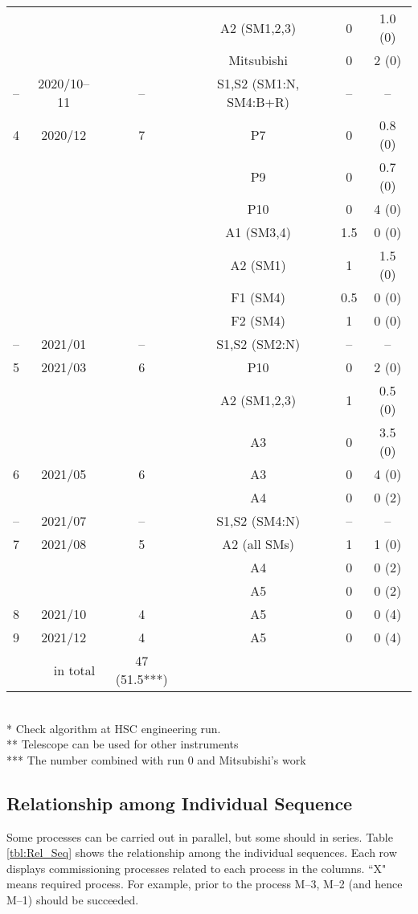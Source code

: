{\begin{table}[!ht]
\begin{center}
\begin{tabular}{*{3}{c}|*{3}{c}}
	&	&					& A2 (SM1,2,3)	& 0 	& 1.0 (0)	\\
	&	& 		& Mitsubishi	& 0		& 2	(0)	\\ \hline
--	& 2020/10--11			& --		& S1,S2 (SM1:N, SM4:B+R)		& --		& --	\\ \hline
4	& 2020/12	& 7 		& P7 			& 0 	& 0.8 (0)	\\
	&	&					& P9  			& 0 	& 0.7 (0)	\\
	&	&					& P10  			& 0 	& 4 (0)	\\
	&	&					& A1 (SM3,4)	& 1.5 	& 0 (0)	\\
	&	&					& A2 (SM1)	& 1 	& 1.5 (0)	\\ 
	&	&					& F1 (SM4)	& 0.5 	& 0 (0)	\\
	&	&					& F2 (SM4)	& 1 	& 0 (0)	\\\hline
--	& 2021/01			& --		& S1,S2 (SM2:N)		& --		& --	\\ \hline
5	& 2021/03	& 6 		& P10 			& 0 	& 2 (0)	\\
	&	&					& A2 (SM1,2,3)	& 1 	& 0.5 (0)	\\
	&	&					& A3 			& 0 	& 3.5 (0)	\\ \hline
6	& 2021/05	& 6					& A3			& 0		& 4 (0)	\\
	&	&					& A4			& 0		& 0 (2)	\\ \hline
--	& 2021/07			& --		& S1,S2 (SM4:N)		& --		& --	\\ \hline
7	& 2021/08	& 5			& A2 (all SMs)	& 1 	& 1 (0)	\\
	&	&					& A4			& 0		& 0	(2)	\\
	&	&					& A5			& 0		& 0 (2)	\\ \hline
8	& 2021/10	& 4			& A5			& 0		& 0 (4)	\\ \hline
9	& 2021/12	& 4			& A5			& 0		& 0 (4)	\\ \hline \hline
\multicolumn{2}{r}{in total}& 47 (51.5***) \\ \hline
\end{tabular}
\\
* Check algorithm at HSC engineering run. \\
** Telescope can be used for other instruments \\
*** The number combined with run 0 and Mitsubishi's work
\end{center}
\end{table}

\clearpage

\subsection{Relationship among Individual Sequence}
Some processes can be carried out in parallel, but some should in series.
Table \ref{tbl:Rel_Seq} shows the relationship among the individual sequences.
Each row displays commissioning processes related to each process in the columns.
``X" means required process.
For example, prior to the process M--3, M--2 (and hence M--1) should be succeeded.

}
